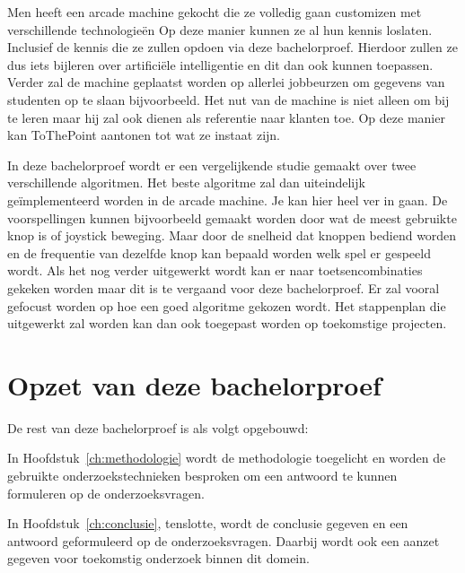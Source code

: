 Men heeft een arcade machine gekocht die ze volledig gaan customizen met verschillende technologieën Op deze manier kunnen ze al hun kennis loslaten. Inclusief de kennis die ze zullen opdoen via deze bachelorproef. Hierdoor zullen ze dus iets bijleren over artificiële intelligentie en dit dan ook kunnen toepassen. Verder zal de machine geplaatst worden op allerlei jobbeurzen om gegevens van studenten op te slaan bijvoorbeeld. Het nut van de machine is niet alleen om bij te leren maar hij zal ook dienen als referentie naar klanten toe. Op deze manier kan ToThePoint aantonen tot wat ze instaat zijn. 

In deze bachelorproef wordt er een vergelijkende studie gemaakt over twee verschillende algoritmen. Het beste algoritme zal dan uiteindelijk geïmplementeerd worden in de arcade machine. Je kan hier heel ver in gaan. De voorspellingen kunnen bijvoorbeeld gemaakt worden door wat de meest gebruikte knop is of joystick beweging. Maar door de snelheid dat knoppen bediend worden en de frequentie van dezelfde knop kan bepaald worden welk spel er gespeeld wordt. Als het nog verder uitgewerkt wordt kan er naar toetsencombinaties gekeken worden maar dit is te vergaand voor deze bachelorproef. Er zal vooral gefocust worden op hoe een goed algoritme gekozen wordt. Het stappenplan die uitgewerkt zal worden kan dan ook toegepast worden op toekomstige projecten.



\section{Opzet van deze bachelorproef}
\label{sec:opzet-bachelorproef}


De rest van deze bachelorproef is als volgt opgebouwd:

In Hoofdstuk~\ref{ch:methodologie} wordt de methodologie toegelicht en worden de gebruikte onderzoekstechnieken besproken om een antwoord te kunnen formuleren op de onderzoeksvragen.


In Hoofdstuk~\ref{ch:conclusie}, tenslotte, wordt de conclusie gegeven en een antwoord geformuleerd op de onderzoeksvragen. Daarbij wordt ook een aanzet gegeven voor toekomstig onderzoek binnen dit domein.

